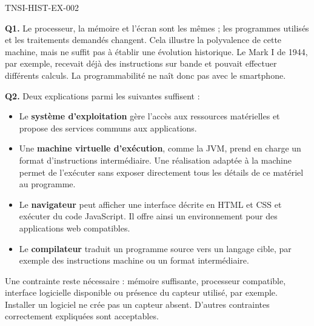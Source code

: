 \begin{corrige}{TNSI-HIST-EX-002}

\textbf{Q1.} Le processeur, la mémoire et l'écran sont les mêmes ; les
programmes utilisés et les traitements demandés changent. Cela illustre la
polyvalence de cette machine, mais ne suffit pas à établir une évolution
historique. Le Mark I de 1944, par exemple, recevait déjà des instructions
sur bande et pouvait effectuer différents calculs. La programmabilité ne
naît donc pas avec le smartphone.

\textbf{Q2.} Deux explications parmi les suivantes suffisent :
\begin{itemize}
  \item Le \textbf{système d'exploitation} gère l'accès aux ressources
    matérielles et propose des services communs aux applications.
  \item Une \textbf{machine virtuelle d'exécution}, comme la JVM, prend en
    charge un format d'instructions intermédiaire. Une réalisation adaptée
    à la machine permet de l'exécuter sans exposer directement tous les
    détails de ce matériel au programme.
  \item Le \textbf{navigateur} peut afficher une interface décrite en HTML
    et CSS et exécuter du code JavaScript. Il offre ainsi un environnement
    pour des applications web compatibles.
  \item Le \textbf{compilateur} traduit un programme source vers un langage
    cible, par exemple des instructions machine ou un format intermédiaire.
\end{itemize}
Une contrainte reste nécessaire : mémoire suffisante, processeur compatible,
interface logicielle disponible ou présence du capteur utilisé, par exemple.
Installer un logiciel ne crée pas un capteur absent. D'autres contraintes
correctement expliquées sont acceptables.

\end{corrige}
